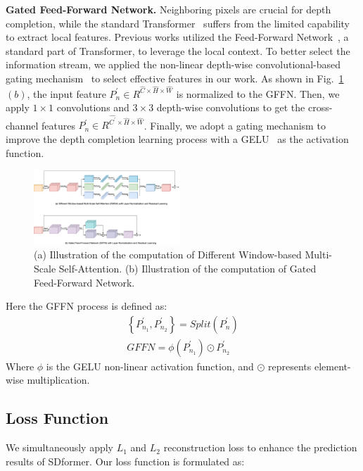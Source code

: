\documentclass[conference]{IEEEtran}
\begin{document}
\textbf{Gated Feed-Forward Network.}
Neighboring pixels are crucial for depth completion, while the standard Transformer~\cite{b3} suffers from the limited capability to extract local features. 
Previous works utilized the Feed-Forward Network~\cite{b9}, a standard part of Transformer, to leverage the local context. To better select the information stream, we applied the non-linear depth-wise convolutional-based gating mechanism~\cite{b13} to select effective features in our work.
As shown in Fig.~\ref{fig:cell}$(b)$, the input feature  $ P_n^{'} \in R^{ {\hat{C}} \times {\hat{H}} \times {\hat{W}} } $ is normalized to the GFFN.
Then, we apply $1\times1$ convolutions and $3\times3$ depth-wise convolutions to get the cross-channel features $ P_n^{'} \in R^{ {\hat{C^{'}}} \times {\hat{H}} \times {\hat{W}} }$. 
Finally, we adopt a gating mechanism to improve the depth completion learning process with a GELU~\cite{b28} as the activation function. 

\begin{figure}[htbp]
\centerline{\includegraphics[width=0.49\textwidth] {cell}}
\caption{(a) Illustration of the computation of Different Window-based Multi-Scale Self-Attention. (b) Illustration of the computation of Gated Feed-Forward Network. }
\label{fig:cell}
\end{figure}

Here the GFFN process is defined as:
\begin{equation}
\begin{array}{l}
\left\{ { P}^{'}_{n_1} ,{ P}^{'}_{n_2} \right\} = {Split} ({ P}_n^{'}) \\
{GFFN}=\phi\left( { P}^{'}_{n_1} \right) \odot { P}^{'}_{n_2} 
\end{array}
\end{equation}
Where $\phi$ is the GELU non-linear activation function, and $\odot$ represents element-wise multiplication.

\subsection{Loss Function}
We simultaneously apply $L_1$ and $L_2$ reconstruction loss to enhance the prediction results of SDformer. Our loss function is formulated as:
\end{document}
